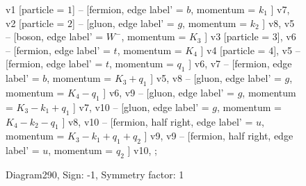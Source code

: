 \documentclass{revtex4}
\begin{document}
\begin{figure}[!htb]
\begin{center}
{    %
v1 [particle = \(1\)] -- [fermion, edge label' = \(b\), momentum = \(k_{1}\) ] v7, 
v2 [particle = \(2\)] -- [gluon, edge label' = \(g\), momentum = \(k_{2}\) ] v8, 
v5 -- [boson, edge label' = \(W^{-}\), momentum = \(K_{3}\) ] v3 [particle = \(3\)], 
v6 -- [fermion, edge label' = \(t\), momentum = \(K_{4}\) ] v4 [particle = \(4\)], 
v5 -- [fermion, edge label' = \(t\), momentum = \(q_{1}\) ] v6, 
v7 -- [fermion, edge label' = \(b\), momentum = \(K_{3} + q_{1}\) ] v5, 
v8 -- [gluon, edge label' = \(g\), momentum = \(K_{4} - q_{1}\) ] v6, 
v9 -- [gluon, edge label' = \(g\), momentum = \(K_{3} - k_{1} + q_{1}\) ] v7, 
v10 -- [gluon, edge label' = \(g\), momentum = \(K_{4} - k_{2} - q_{1}\) ] v8, 
v10 -- [fermion, half right, edge label' = \(u\), momentum = \(K_{3} - k_{1} + q_{1} + q_{2}\) ] v9, 
v9 -- [fermion, half right, edge label' = \(u\), momentum = \(q_{2}\) ] v10, 
};
\end{center}
\caption{Diagram290, Sign: -1, Symmetry factor: 1}
\end{figure}
\newpage
\end{document}
